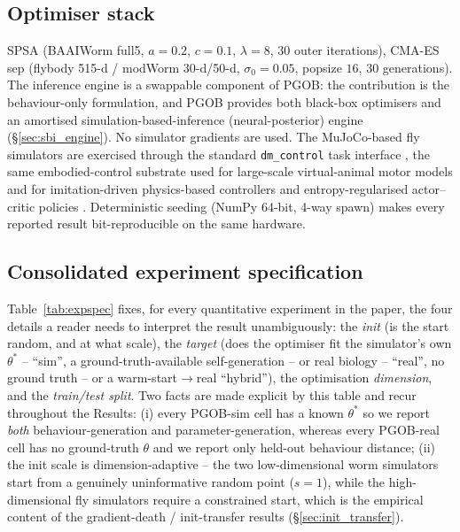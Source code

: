 \documentclass[11pt]{article}
\begin{document}
\subsection{Optimiser stack}
SPSA \citep{spall1992multivariate,spall2003introduction} (BAAIWorm full5, $a{=}0.2$, $c{=}0.1$, $\lambda{=}8$, 30 outer iterations), CMA-ES sep \citep{hansen2001completely,hansen2016cma} (flybody 515-d / modWorm 30-d/50-d, $\sigma_0{=}0.05$, popsize $16$, 30 generations). The inference engine is a swappable component of PGOB: the contribution is the behaviour-only formulation, and PGOB provides both black-box optimisers and an amortised simulation-based-inference (neural-posterior) engine \citep{cranmer2020frontier} (\S\ref{sec:sbi_engine}). No simulator gradients are used. The MuJoCo-based fly simulators are exercised through the standard \texttt{dm\_control} task interface \citep{tassa2018deepmind}, the same embodied-control substrate used for large-scale virtual-animal motor models \citep{merel2019deep,aldarondo2024virtual} and for imitation-driven physics-based controllers \citep{peng2018deepmimic} and entropy-regularised actor--critic policies \citep{haarnoja2018soft}. Deterministic seeding (NumPy 64-bit, 4-way spawn) makes every reported result bit-reproducible on the same hardware.

\subsection{Consolidated experiment specification}
\label{sec:expspec}
Table~\ref{tab:expspec} fixes, for every quantitative experiment in the paper, the four details a reader needs to interpret the result unambiguously: the \emph{init} (is the start random, and at what scale), the \emph{target} (does the optimiser fit the simulator's own $\theta^{*}$ -- ``sim'', a ground-truth-available self-generation -- or real biology -- ``real'', no ground truth -- or a warm-start$\to$real ``hybrid''), the optimisation \emph{dimension}, and the \emph{train/test split}. Two facts are made explicit by this table and recur throughout the Results: (i) every PGOB-sim cell has a known $\theta^{*}$ so we report \emph{both} behaviour-generation and parameter-generation, whereas every PGOB-real cell has no ground-truth $\theta$ and we report only held-out behaviour distance; (ii) the init scale is dimension-adaptive -- the two low-dimensional worm simulators start from a genuinely uninformative random point ($s{=}1$), while the high-dimensional fly simulators require a constrained start, which is the empirical content of the gradient-death / init-transfer results (\S\ref{sec:init_transfer}).
\end{document}
